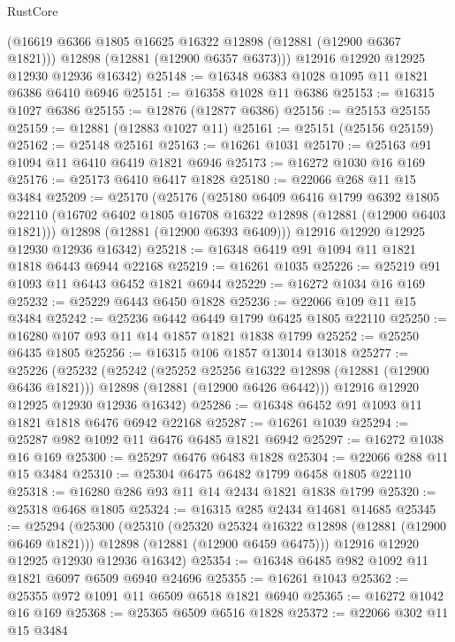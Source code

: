 \begin{lexlean}{RustCore}
\begin{coremodule}
        (@16619 @6366 @1805 @16625 @16322 @12898 (@12881 (@12900 @6367 @1821)))
        @12898
        (@12881 (@12900 @6357 @6373)))
      @12916
      @12920
      @12925
      @12930
      @12936
      @16342)
@25148 := @16348 @6383 @1028 @1095 @11 @1821 @6386 @6410 @6946
@25151 := @16358 @1028 @11 @6386
@25153 := @16315 @1027 @6386
@25155 := @12876 (@12877 @6386)
@25156 := @25153 @25155
@25159 := @12881 (@12883 @1027 @11)
@25161 := @25151 (@25156 @25159)
@25162 := @25148 @25161
@25163 := @16261 @1031
@25170 := @25163 @91 @1094 @11 @6410 @6419 @1821 @6946
@25173 := @16272 @1030 @16 @169
@25176 := @25173 @6410 @6417 @1828
@25180 := @22066 @268 @11 @15 @3484
@25209 := @25170
    (@25176
      (@25180
        @6409
        @6416
        @1799
        @6392
        @1805
        @22110
        (@16702 @6402 @1805 @16708 @16322 @12898 (@12881 (@12900 @6403 @1821)))
        @12898
        (@12881 (@12900 @6393 @6409)))
      @12916
      @12920
      @12925
      @12930
      @12936
      @16342)
@25218 := @16348 @6419 @91 @1094 @11 @1821 @1818 @6443 @6944 @22168
@25219 := @16261 @1035
@25226 := @25219 @91 @1093 @11 @6443 @6452 @1821 @6944
@25229 := @16272 @1034 @16 @169
@25232 := @25229 @6443 @6450 @1828
@25236 := @22066 @109 @11 @15 @3484
@25242 := @25236 @6442 @6449 @1799 @6425 @1805 @22110
@25250 := @16280 @107 @93 @11 @14 @1857 @1821 @1838 @1799
@25252 := @25250 @6435 @1805
@25256 := @16315 @106 @1857 @13014 @13018
@25277 := @25226
    (@25232
      (@25242
        (@25252 @25256 @16322 @12898 (@12881 (@12900 @6436 @1821)))
        @12898
        (@12881 (@12900 @6426 @6442)))
      @12916
      @12920
      @12925
      @12930
      @12936
      @16342)
@25286 := @16348 @6452 @91 @1093 @11 @1821 @1818 @6476 @6942 @22168
@25287 := @16261 @1039
@25294 := @25287 @982 @1092 @11 @6476 @6485 @1821 @6942
@25297 := @16272 @1038 @16 @169
@25300 := @25297 @6476 @6483 @1828
@25304 := @22066 @288 @11 @15 @3484
@25310 := @25304 @6475 @6482 @1799 @6458 @1805 @22110
@25318 := @16280 @286 @93 @11 @14 @2434 @1821 @1838 @1799
@25320 := @25318 @6468 @1805
@25324 := @16315 @285 @2434 @14681 @14685
@25345 := @25294
    (@25300
      (@25310
        (@25320 @25324 @16322 @12898 (@12881 (@12900 @6469 @1821)))
        @12898
        (@12881 (@12900 @6459 @6475)))
      @12916
      @12920
      @12925
      @12930
      @12936
      @16342)
@25354 := @16348 @6485 @982 @1092 @11 @1821 @6097 @6509 @6940 @24696
@25355 := @16261 @1043
@25362 := @25355 @972 @1091 @11 @6509 @6518 @1821 @6940
@25365 := @16272 @1042 @16 @169
@25368 := @25365 @6509 @6516 @1828
@25372 := @22066 @302 @11 @15 @3484

\end{coremodule}
\end{lexlean}
